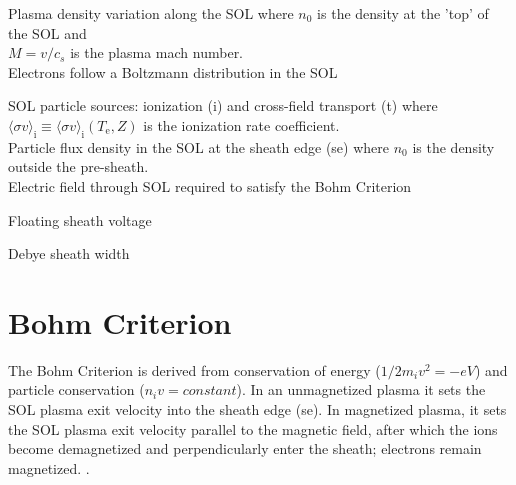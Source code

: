 \noindent
Plasma density variation along the SOL 
\indent where $n_0$ is the density at the 'top' of the SOL and \\
\indent $M=v/c_s$ is the plasma mach number.\\

\noindent
Electrons follow a Boltzmann distribution in the SOL 

\noindent
SOL particle sources: ionization (i) and cross-field transport (t) 
\indent
where $\langle\sigma v\rangle_\mathrm{i} \equiv \langle\sigma v\rangle_\mathrm{i}(T_\mathrm{e},Z)$ is the ionization rate coefficient.\\

\noindent
Particle flux density in the SOL at the sheath edge (se) 
\indent where $n_0$ is the density outside the pre-sheath.\\

\noindent
Electric field through SOL required to satisfy the Bohm Criterion 

\noindent
Floating sheath voltage 

\noindent
Debye sheath width 


\section{Bohm Criterion}
The Bohm Criterion is derived from conservation of energy
($1/2m_iv^2=-eV$) and particle conservation ($n_iv=constant$).  In an
unmagnetized plasma it sets the SOL plasma exit velocity into the
sheath edge (se). In magnetized plasma, it sets the SOL plasma exit
velocity parallel to the magnetic field, after which the ions become
demagnetized and perpendicularly enter the sheath; electrons remain
magnetized. .\\


